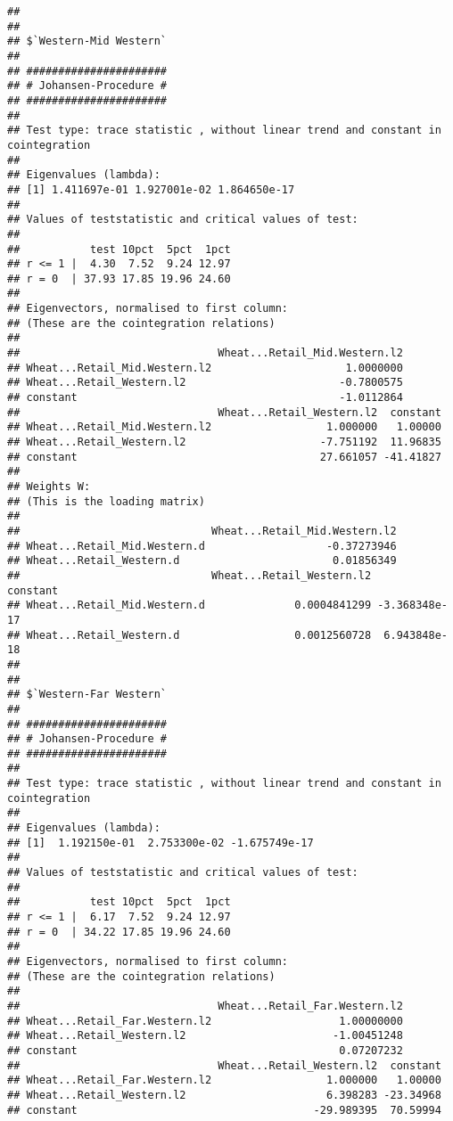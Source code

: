 \documentclass[12pt,]{article}
\begin{document}
\begin{verbatim}
## 
## 
## $`Western-Mid Western`
## 
## ###################### 
## # Johansen-Procedure # 
## ###################### 
## 
## Test type: trace statistic , without linear trend and constant in cointegration 
## 
## Eigenvalues (lambda):
## [1] 1.411697e-01 1.927001e-02 1.864650e-17
## 
## Values of teststatistic and critical values of test:
## 
##           test 10pct  5pct  1pct
## r <= 1 |  4.30  7.52  9.24 12.97
## r = 0  | 37.93 17.85 19.96 24.60
## 
## Eigenvectors, normalised to first column:
## (These are the cointegration relations)
## 
##                               Wheat...Retail_Mid.Western.l2
## Wheat...Retail_Mid.Western.l2                     1.0000000
## Wheat...Retail_Western.l2                        -0.7800575
## constant                                         -1.0112864
##                               Wheat...Retail_Western.l2  constant
## Wheat...Retail_Mid.Western.l2                  1.000000   1.00000
## Wheat...Retail_Western.l2                     -7.751192  11.96835
## constant                                      27.661057 -41.41827
## 
## Weights W:
## (This is the loading matrix)
## 
##                              Wheat...Retail_Mid.Western.l2
## Wheat...Retail_Mid.Western.d                   -0.37273946
## Wheat...Retail_Western.d                        0.01856349
##                              Wheat...Retail_Western.l2      constant
## Wheat...Retail_Mid.Western.d              0.0004841299 -3.368348e-17
## Wheat...Retail_Western.d                  0.0012560728  6.943848e-18
## 
## 
## $`Western-Far Western`
## 
## ###################### 
## # Johansen-Procedure # 
## ###################### 
## 
## Test type: trace statistic , without linear trend and constant in cointegration 
## 
## Eigenvalues (lambda):
## [1]  1.192150e-01  2.753300e-02 -1.675749e-17
## 
## Values of teststatistic and critical values of test:
## 
##           test 10pct  5pct  1pct
## r <= 1 |  6.17  7.52  9.24 12.97
## r = 0  | 34.22 17.85 19.96 24.60
## 
## Eigenvectors, normalised to first column:
## (These are the cointegration relations)
## 
##                               Wheat...Retail_Far.Western.l2
## Wheat...Retail_Far.Western.l2                    1.00000000
## Wheat...Retail_Western.l2                       -1.00451248
## constant                                         0.07207232
##                               Wheat...Retail_Western.l2  constant
## Wheat...Retail_Far.Western.l2                  1.000000   1.00000
## Wheat...Retail_Western.l2                      6.398283 -23.34968
## constant                                     -29.989395  70.59994

\end{verbatim}
\end{document}
